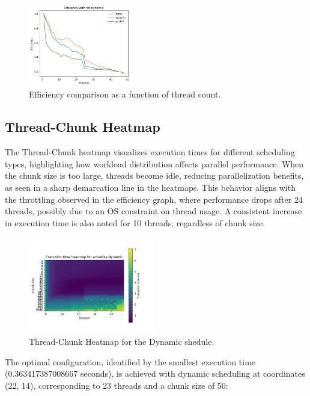 \documentclass[english,11pt]{article}
\begin{document}
\begin{figure}[h!]
    \centering
    \includegraphics[width=0.4\textwidth]{graph/Efficiency.png}
    \caption{Efficiency comparison as a function of thread count.}
    \label{fig:efficiency}
\end{figure}


\subsection{Thread-Chunk Heatmap}
The Thread-Chunk heatmap visualizes execution times for different scheduling types, highlighting how workload distribution affects parallel performance. When the chunk size is too large, threads become idle, reducing parallelization benefits, as seen in a sharp demarcation line in the heatmaps. This behavior aligns with the throttling observed in the efficiency graph, where performance drops after 24 threads, possibly due to an OS constraint on thread usage. A consistent increase in execution time is also noted for 10 threads, regardless of chunk size.

\begin{figure}[h!]
    \centering
    \includegraphics[width=0.5\textwidth]{graph/Heat_dynamic.png}
    \caption{Thread-Chunk Heatmap for the Dynamic shedule.}
    \label{fig:efficiency}
\end{figure}

The optimal configuration, identified by the smallest execution time (0.363417387008667 seconds), is achieved with dynamic scheduling at coordinates (22, 14), corresponding to 23 threads and a chunk size of 50:
\end{document}
